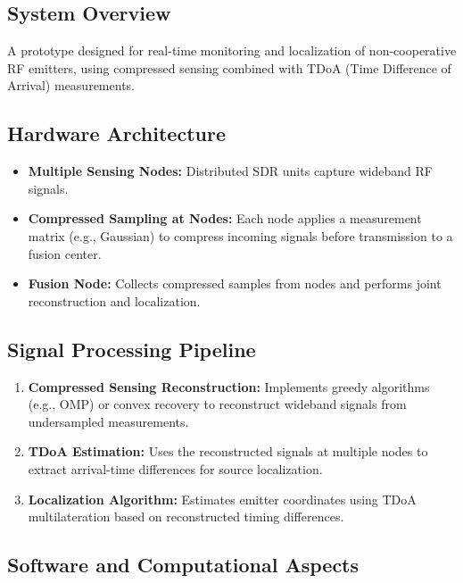\documentclass[14pt]{book}
\begin{document}
\subsection{System Overview}
A prototype designed for real-time monitoring and localization of non-cooperative RF emitters, using compressed sensing combined with TDoA (Time Difference of Arrival) measurements.

\subsection{Hardware Architecture}

\begin{itemize}
	\item \textbf{Multiple Sensing Nodes:} Distributed SDR units capture wideband RF signals.
	
	\item \textbf{Compressed Sampling at Nodes:} Each node applies a measurement matrix (e.g., Gaussian) to compress incoming signals before transmission to a fusion center.
	
	\item \textbf{Fusion Node:} Collects compressed samples from nodes and performs joint reconstruction and localization.
\end{itemize}

\subsection{Signal Processing Pipeline}

\begin{enumerate}
	\item \textbf{Compressed Sensing Reconstruction:} Implements greedy algorithms (e.g., OMP) or convex recovery to reconstruct wideband signals from undersampled measurements.
	
	\item \textbf{TDoA Estimation:} Uses the reconstructed signals at multiple nodes to extract arrival-time differences for source localization.
	
	\item \textbf{Localization Algorithm:} Estimates emitter coordinates using TDoA multilateration based on reconstructed timing differences.
\end{enumerate}

\subsection{Software and Computational Aspects}
\end{document}
